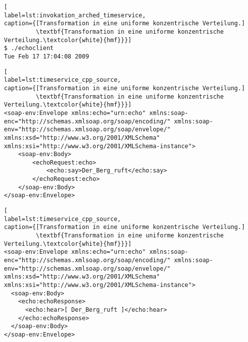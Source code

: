 \begin{minipage}[t]{\textwidth}
\begin{lstlisting}[
label=lst:invokation_arched_timeservice,
caption={[Transformation in eine uniforme konzentrische Verteilung.]
         \textbf{Transformation in eine uniforme konzentrische Verteilung.\textcolor{white}{hmf}}}]
$ ./echoclient
Tue Feb 17 17:04:08 2009
\end{lstlisting}
\end{minipage}





\begin{minipage}[t]{\textwidth}
\begin{lstlisting}[
label=lst:timeservice_cpp_source,
caption={[Transformation in eine uniforme konzentrische Verteilung.]
         \textbf{Transformation in eine uniforme konzentrische Verteilung.\textcolor{white}{hmf}}}]
<soap-env:Envelope xmlns:echo="urn:echo" xmlns:soap-enc="http://schemas.xmlsoap.org/soap/encoding/" xmlns:soap-env="http://schemas.xmlsoap.org/soap/envelope/" xmlns:xsd="http://www.w3.org/2001/XMLSchema" xmlns:xsi="http://www.w3.org/2001/XMLSchema-instance">
	<soap-env:Body>
		<echoRequest:echo>
			<echo:say>Der_Berg_ruft</echo:say>
		</echoRequest:echo>
	</soap-env:Body>
</soap-env:Envelope>
\end{lstlisting}
\end{minipage}


\begin{minipage}[t]{\textwidth}
\begin{lstlisting}[
label=lst:timeservice_cpp_source,
caption={[Transformation in eine uniforme konzentrische Verteilung.]
         \textbf{Transformation in eine uniforme konzentrische Verteilung.\textcolor{white}{hmf}}}]
<soap-env:Envelope xmlns:echo="urn:echo" xmlns:soap-enc="http://schemas.xmlsoap.org/soap/encoding/" xmlns:soap-env="http://schemas.xmlsoap.org/soap/envelope/" xmlns:xsd="http://www.w3.org/2001/XMLSchema" xmlns:xsi="http://www.w3.org/2001/XMLSchema-instance">
  <soap-env:Body>
    <echo:echoResponse>
      <echo:hear>[ Der_Berg_ruft ]</echo:hear>
    </echo:echoResponse>
  </soap-env:Body>
</soap-env:Envelope>
\end{lstlisting}
\end{minipage}
